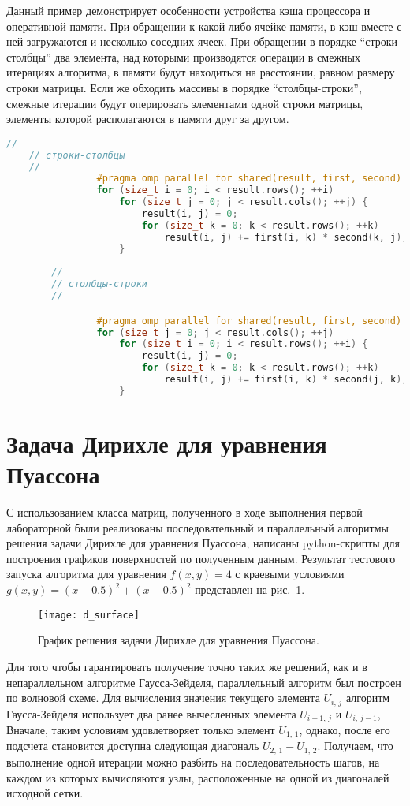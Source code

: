\documentclass[13pt]{article}
\begin{document}
	Данный пример демонстрирует особенности устройства кэша процессора и оперативной памяти. При обращении к какой-либо ячейке памяти, в кэш вместе с ней загружаются и несколько соседних ячеек. При обращении в порядке ``строки-столбцы'' два элемента, над которыми производятся операции в смежных итерациях алгоритма, в памяти будут находиться на расстоянии, равном размеру строки матрицы. Если же обходить массивы в порядке ``столбцы-строки'', смежные итерации будут оперировать элементами одной строки матрицы, элементы которой располагаются в памяти друг за другом.
	
	\begin{lstlisting}[language=C++, caption={Два способа обхода матрицы}, label={lst:matrixLookup}, texcl=true]
	//
	// строки-столбцы
	//
				#pragma omp parallel for shared(result, first, second)
				for (size_t i = 0; i < result.rows(); ++i) 
					for (size_t j = 0; j < result.cols(); ++j) {
						result(i, j) = 0;
						for (size_t k = 0; k < result.rows(); ++k) 
							result(i, j) += first(i, k) * second(k, j);
					}
					
		//
		// столбцы-строки
		//

				#pragma omp parallel for shared(result, first, second)
				for (size_t j = 0; j < result.cols(); ++j) 
					for (size_t i = 0; i < result.rows(); ++i) {
						result(i, j) = 0;
						for (size_t k = 0; k < result.rows(); ++k) 
							result(i, j) += first(i, k) * second(j, k);
					}

	\end{lstlisting}
	\section{Задача Дирихле для уравнения Пуассона}\label{sec:lab2}

	С использованием класса матриц, полученного в ходе выполнения первой лабораторной были реализованы последовательный и параллельный алгоритмы решения задачи Дирихле для уравнения Пуассона, написаны python-скрипты для построения графиков поверхностей по полученным данным.
	Результат тестового запуска алгоритма для уравнения $f(x,y) = 4$ с краевыми условиями $g(x,y) =(x - 0.5)^2 + (x - 0.5)^2$ представлен на рис.~\ref{fig:surfPlot}.
	\begin{figure}[h]
		\centering		\texttt{[image: d\_surface]}
		\caption{График решения задачи Дирихле для уравнения Пуассона.}
		\label{fig:surfPlot} 
	\end{figure}

	Для того чтобы гарантировать получение точно таких же решений, как и в непараллельном алгоритме Гаусса-Зейделя, параллельный алгоритм был построен по волновой схеме. Для вычисления значения текущего элемента $U_{i,\,j}$ алгоритм Гаусса-Зейделя использует два ранее вычесленных элемента $U_{i-1,\,j}$ и $U_{i,\,j-1}$, Вначале, таким условиям удовлетворяет только элемент $U_{1,\,1}$, однако, после его подсчета становится доступна следующая диагональ $U_{2,\,1} - U_{1,\,2}$. Получаем,	что выполнение одной итерации можно разбить на последовательность шагов, на каждом из которых вычисляются узлы, расположенные на одной из диагоналей исходной сетки.
\end{document}
